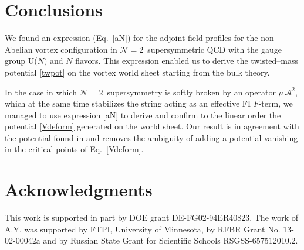\documentclass[12pt]{article}
\newcommand{\ntwon}{${\mathcal N}=2$}
\newcommand{\ma}{\mathcal{A}}
\begin{document}
\section{Conclusions}

	We found an expression (Eq.~\eqref{aN}) for the adjoint field profiles 
	for the non-Abelian vortex configuration in \ntwon\, supersymmetric QCD 
	with the gauge group U($N)$ and  $ N $ flavors.
	This expression  enabled us to derive the twisted--mass potential \eqref{twpot} on the 
	vortex world sheet starting from the bulk theory.

	In the case in which \ntwon\, supersymmetry is softly broken by an operator $ \mu\, \ma^2 $, 
	which at the same time stabilizes the string acting as an effective FI $ F $-term,
	we managed to use expression \eqref{aN} to derive and confirm to the linear order
	the potential \eqref{Vdeform} generated on the world sheet.
	Our result is in agreement with the potential found in \cite{Shifman:2010kr}
	and removes the ambiguity of adding a potential vanishing in the critical points of Eq.~\eqref{Vdeform}.




\section*{Acknowledgments}

	This work  is supported in part by DOE grant DE-FG02-94ER40823. 
	The work of A.Y. was  supported 
	by  FTPI, University of Minnesota, 
	by RFBR Grant No. 13-02-00042a 
	and by Russian State Grant for 
	Scientific Schools RSGSS-657512010.2.
\end{document}
